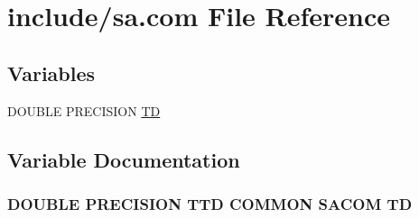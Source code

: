\hypertarget{home_2abonfi_2_c_f_d__codes_2_eul_f_s_83_84_2include_2sa_8com}{\section{include/sa.com File Reference}
\label{home_2abonfi_2_c_f_d__codes_2_eul_f_s_83_84_2include_2sa_8com}
}
\subsection*{Variables}
\begin{DoxyCompactItemize}
\item 
D\-O\-U\-B\-L\-E P\-R\-E\-C\-I\-S\-I\-O\-N \hyperlink{home_2abonfi_2_c_f_d__codes_2_eul_f_s_83_84_2include_2sa_8com_aaac56f2de1ace407a7ad1003554d2bff}{T\-D}
\end{DoxyCompactItemize}


\subsection{Variable Documentation}
\hypertarget{home_2abonfi_2_c_f_d__codes_2_eul_f_s_83_84_2include_2sa_8com_aaac56f2de1ace407a7ad1003554d2bff}{
\subsubsection[{T\-D}]{\setlength{\rightskip}{0pt plus 5cm}D\-O\-U\-B\-L\-E P\-R\-E\-C\-I\-S\-I\-O\-N T\-T\-D C\-O\-M\-M\-O\-N S\-A\-C\-O\-M T\-D}}\label{home_2abonfi_2_c_f_d__codes_2_eul_f_s_83_84_2include_2sa_8com_aaac56f2de1ace407a7ad1003554d2bff}
